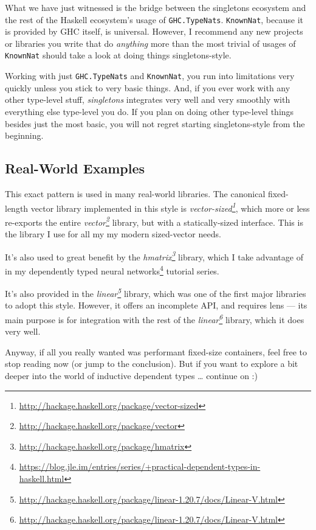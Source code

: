 \documentclass[]{article}
\renewcommand{\href}[2]{#2\footnote{\url{#1}}}
\begin{document}
What we have just witnessed is the bridge between the singletons ecosystem and
the rest of the Haskell ecosystem's usage of \texttt{GHC.TypeNats}.
\texttt{KnownNat}, because it is provided by GHC itself, is universal. However,
I recommend any new projects or libraries you write that do \emph{anything} more
than the most trivial of usages of \texttt{KnownNat} should take a look at doing
things singletons-style.

Working with just \texttt{GHC.TypeNats} and \texttt{KnownNat}, you run into
limitations very quickly unless you stick to very basic things. And, if you ever
work with any other type-level stuff, \emph{singletons} integrates very well and
very smoothly with everything else type-level you do. If you plan on doing other
type-level things besides just the most basic, you will not regret starting
singletons-style from the beginning.

\subsection{Real-World Examples}\label{real-world-examples}

This exact pattern is used in many real-world libraries. The canonical
fixed-length vector library implemented in this style is
\emph{\href{http://hackage.haskell.org/package/vector-sized}{vector-sized}},
which more or less re-exports the entire
\emph{\href{http://hackage.haskell.org/package/vector}{vector}} library, but
with a statically-sized interface. This is the library I use for all my my
modern sized-vector needs.

It's also used to great benefit by the
\emph{\href{http://hackage.haskell.org/package/hmatrix}{hmatrix}} library, which
I take advantage of in my
\href{https://blog.jle.im/entries/series/+practical-dependent-types-in-haskell.html}{dependently
typed neural networks} tutorial series.

It's also provided in the
\emph{\href{http://hackage.haskell.org/package/linear-1.20.7/docs/Linear-V.html}{linear}}
library, which was one of the first major libraries to adopt this style.
However, it offers an incomplete API, and requires lens --- its main purpose is
for integration with the rest of the
\emph{\href{http://hackage.haskell.org/package/linear-1.20.7/docs/Linear-V.html}{linear}}
library, which it does very well.

Anyway, if all you really wanted was performant fixed-size containers, feel free
to stop reading now (or jump to the conclusion). But if you want to explore a
bit deeper into the world of inductive dependent types \ldots{} continue on :)
\end{document}
